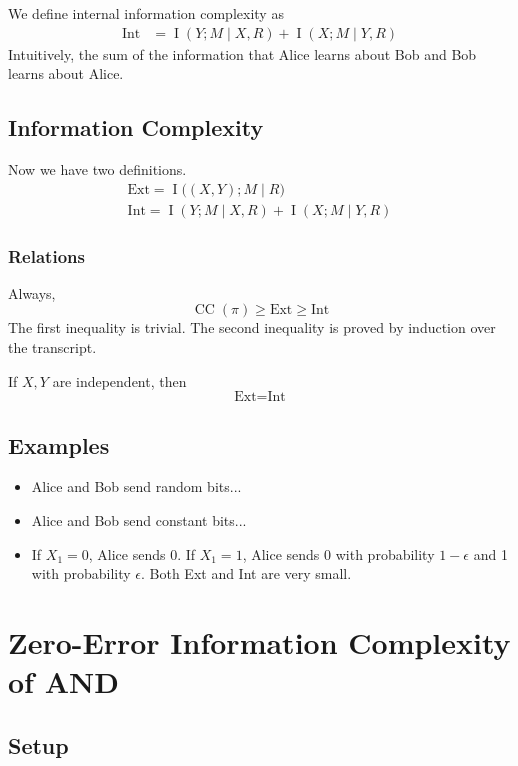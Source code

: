 \documentclass{article}
\begin{document}
We define internal information complexity as 
\begin{align*}
    \text{Int} &= \operatorname{I}(Y; M\mid X, R) + \operatorname{I}(X; M\mid Y, R)
\end{align*}
Intuitively, the sum of the information that Alice learns about Bob and Bob learns about Alice.

\subsection{Information Complexity}

Now we have two definitions.
\begin{gather*}
    \text{Ext} = \operatorname{I}\big(\left(X,Y\right); M\mid R\big)\\
    \text{Int} = \operatorname{I}(Y; M\mid X, R) + \operatorname{I}(X; M\mid Y, R)
\end{gather*}

\subsubsection{Relations}
Always,
\[
\operatorname{CC}(\pi) \geq \text{Ext} \geq \text{Int}
\]
The first inequality is trivial. The second inequality is proved by induction over the transcript.

If $X,Y$ are independent, then 
\[
\text{Ext} = \text{Int}
\]

\subsection{Examples}

\begin{itemize}
    \item Alice and Bob send random bits...
    \item Alice and Bob send constant bits... 
    \item If $X_1=0$, Alice sends 0. If $X_1=1$, Alice sends 0 with probability $1-\epsilon$ and 1 with probability $\epsilon$. Both Ext and Int are very small.
\end{itemize}


\section{Zero-Error Information Complexity of AND}

\subsection{Setup}
\end{document}
